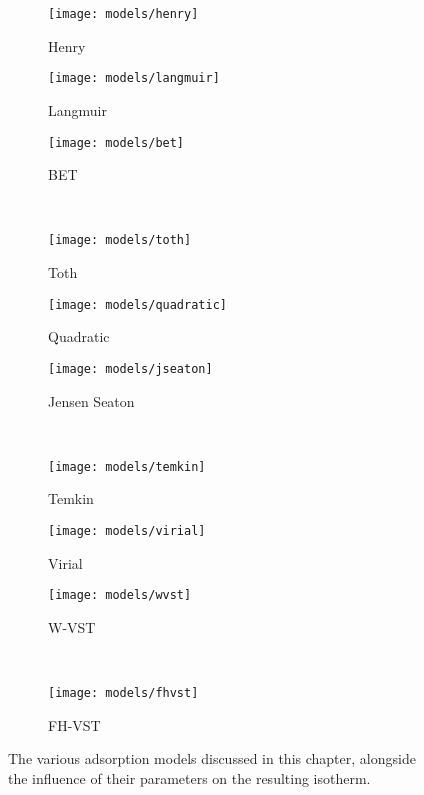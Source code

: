 \begin{figure}[p]
	\centering

	\begin{subfigure}{0.3\linewidth}
		\caption{Henry}\label{pyg:fgr:henryex}%
		\texttt{[image: models/henry]}
	\end{subfigure}%
	\begin{subfigure}{0.3\linewidth}
		\caption{Langmuir}\label{pyg:fgr:langmuirex}%
		\texttt{[image: models/langmuir]}
	\end{subfigure}%
	\begin{subfigure}{0.3\linewidth}
		\caption{BET}\label{pyg:fgr:betex}%
		\texttt{[image: models/bet]}
	\end{subfigure}%
	\\
	\begin{subfigure}{0.3\linewidth}
		\caption{Toth}\label{pyg:fgr:tothex}%
		\texttt{[image: models/toth]}
	\end{subfigure}%
	\begin{subfigure}{0.3\linewidth}
		\caption{Quadratic}\label{pyg:fgr:quadraticex}%
		\texttt{[image: models/quadratic]}
	\end{subfigure}%
	\begin{subfigure}{0.3\linewidth}
		\caption{Jensen Seaton}\label{pyg:fgr:jseatonex}%
		\texttt{[image: models/jseaton]}
	\end{subfigure}%
	\\
	\begin{subfigure}{0.3\linewidth}
		\caption{Temkin}\label{pyg:fgr:temkinex}
		\texttt{[image: models/temkin]}
	\end{subfigure}%
	\begin{subfigure}{0.3\linewidth}
		\caption{Virial}\label{pyg:fgr:virialex}%
		\texttt{[image: models/virial]}
	\end{subfigure}%
	\begin{subfigure}{0.3\linewidth}
		\caption{W-VST}\label{pyg:fgr:wsvstex}%
		\texttt{[image: models/wvst]}
	\end{subfigure}%
	\\
	\begin{subfigure}{0.3\linewidth}
		\caption{FH-VST}\label{pyg:fgr:fhvstex}%
		\texttt{[image: models/fhvst]}
	\end{subfigure}%

	\caption{The various adsorption models
		discussed in this chapter, alongside the influence
		of their parameters on the resulting isotherm.
	}\label{pyg:fgr:modelex}
\end{figure}

